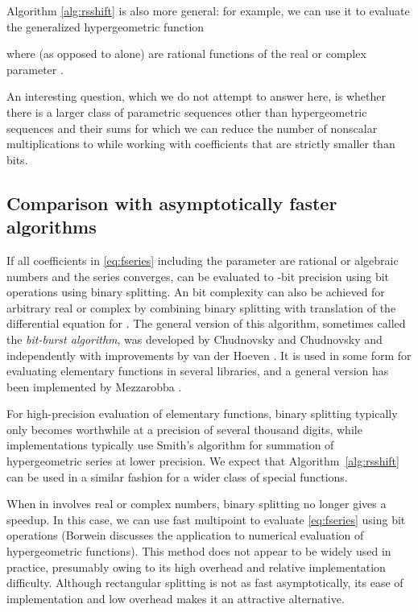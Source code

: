 \documentclass{sig-alternate}
\begin{document}
Algorithm \ref{alg:rsshift} is also more general:
for example, we can use it to evaluate the
generalized hypergeometric function

where  (as opposed to  alone) are rational functions of
the real or complex parameter .

An interesting question, which we do not attempt to answer here, is
whether there is a larger class of parametric sequences other than
hypergeometric sequences and their sums for which we can reduce
the number of nonscalar multiplications to 
while working with coefficients that are strictly smaller than
 bits.

\subsection{Comparison with asymptotically faster \\ algorithms}

If all coefficients in \eqref{eq:fseries} including the parameter 
are rational or algebraic numbers and the series converges,  can be evaluated
to -bit precision using  bit operations
using binary splitting. 
An  bit complexity can also
be achieved for arbitrary real or complex  by combining
binary splitting with translation of the
differential equation for .
The general version of this algorithm, sometimes called the \emph{bit-burst algorithm},
was developed by Chudnovsky and Chudnovsky and independently
with improvements by van der Hoeven \cite{vdH:hol}. It is used
in some form
for evaluating elementary functions in several libraries,
and a general version has been implemented by Mezzarobba \cite{Mezzarobba2010}.

For high-precision evaluation of elementary functions, binary splitting typically only
becomes worthwhile at a precision of several thousand digits,
while implementations typically use Smith's algorithm for summation of hypergeometric series
at lower precision.
We expect that Algorithm~\ref{alg:rsshift} can be used
in a similar fashion for a wider class of special functions.

When  in  involves real or complex numbers,
binary splitting no longer gives a speedup. In this case,
we can use fast multipoint to evaluate \eqref{eq:fseries} using
 bit operations
(Borwein \cite{Borwein1987} discusses the application to numerical evaluation
of hypergeometric functions). This method does not appear to be
widely used in practice, presumably owing to its high overhead and relative
implementation difficulty. Although rectangular splitting is
not as fast asymptotically, its ease of implementation and low overhead
makes it an attractive alternative.
\end{document}
